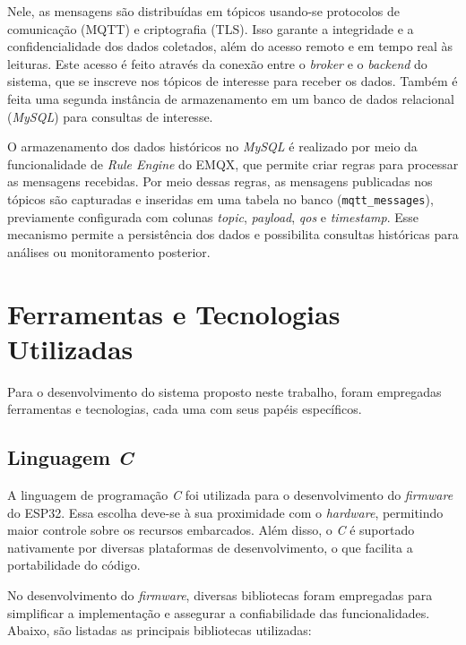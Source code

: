 Nele, as mensagens são distribuídas em tópicos usando-se protocolos de comunicação (MQTT) e criptografia (TLS). Isso garante a integridade e a confidencialidade dos dados coletados, além do acesso remoto e em tempo real às leituras. Este acesso é feito através da conexão entre o \textit{broker} e o \textit{backend} do sistema, que se inscreve nos tópicos de interesse para receber os dados. Também é feita uma segunda instância de armazenamento em um banco de dados relacional (\textit{MySQL}) para consultas de interesse. 

O armazenamento dos dados históricos no \textit{MySQL} é realizado por meio da funcionalidade de \textit{Rule Engine} do EMQX, que permite criar regras para processar as mensagens recebidas. Por meio dessas regras, as mensagens publicadas nos tópicos são capturadas e inseridas em uma tabela no banco (\texttt{mqtt\_messages}), previamente configurada com colunas \textit{topic}, \textit{payload}, \textit{qos} e \textit{timestamp}. Esse mecanismo permite a persistência dos dados e possibilita consultas históricas para análises ou monitoramento posterior.

\section{Ferramentas e Tecnologias Utilizadas}

Para o desenvolvimento do sistema proposto neste trabalho, foram empregadas ferramentas e tecnologias, cada uma com seus papéis específicos.

\subsection{Linguagem \textit{C}}
A linguagem de programação \textit{C} foi utilizada para o desenvolvimento do \textit{firmware} do ESP32. Essa escolha deve-se à sua proximidade com o \textit{hardware}, permitindo maior controle sobre os recursos embarcados. Além disso, o \textit{C} é suportado nativamente por diversas plataformas de desenvolvimento, o que facilita a portabilidade do código.

No desenvolvimento do \textit{firmware}, diversas bibliotecas foram empregadas para simplificar a implementação e assegurar a confiabilidade das funcionalidades. Abaixo, são listadas as principais bibliotecas utilizadas:

